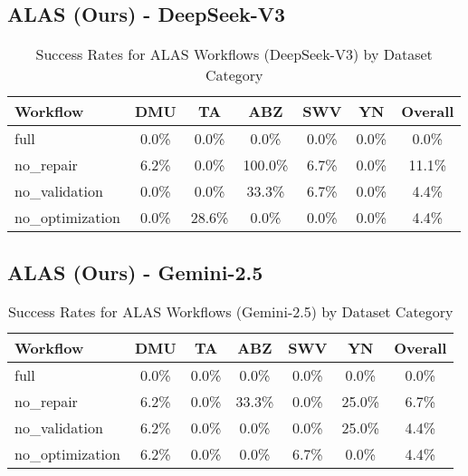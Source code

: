 \documentclass{article}
\begin{document}
\subsection*{ALAS (Ours) - DeepSeek-V3}
\begin{longtable}{|l|c|c|c|c|c|c|}
\caption{Success Rates for ALAS Workflows (DeepSeek-V3) by Dataset Category} \\
\toprule
\textbf{Workflow} & \textbf{DMU} & \textbf{TA} & \textbf{ABZ} & \textbf{SWV} & \textbf{YN} & \textbf{Overall} \\
\midrule
\endhead
full & 0.0\% & 0.0\% & 0.0\% & 0.0\% & 0.0\% & 0.0\% \\
no_repair & 6.2\% & 0.0\% & 100.0\% & 6.7\% & 0.0\% & 11.1\% \\
no_validation & 0.0\% & 0.0\% & 33.3\% & 6.7\% & 0.0\% & 4.4\% \\
no_optimization & 0.0\% & 28.6\% & 0.0\% & 0.0\% & 0.0\% & 4.4\% \\
\bottomrule
\end{longtable}

\subsection*{ALAS (Ours) - Gemini-2.5}
\begin{longtable}{|l|c|c|c|c|c|c|}
\caption{Success Rates for ALAS Workflows (Gemini-2.5) by Dataset Category} \\
\toprule
\textbf{Workflow} & \textbf{DMU} & \textbf{TA} & \textbf{ABZ} & \textbf{SWV} & \textbf{YN} & \textbf{Overall} \\
\midrule
\endhead
full & 0.0\% & 0.0\% & 0.0\% & 0.0\% & 0.0\% & 0.0\% \\
no_repair & 6.2\% & 0.0\% & 33.3\% & 0.0\% & 25.0\% & 6.7\% \\
no_validation & 6.2\% & 0.0\% & 0.0\% & 0.0\% & 25.0\% & 4.4\% \\
no_optimization & 6.2\% & 0.0\% & 0.0\% & 6.7\% & 0.0\% & 4.4\% \\
\bottomrule
\end{longtable}
\end{document}
